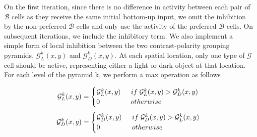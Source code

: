 \documentclass[12pt]{article}
\begin{document}
On the first iteration, since there is no difference in activity between each pair of 
$\mathcal{B}$
cells as they receive the same initial bottom-up input, we omit the inhibition by the non-preferred
$\mathcal{B}$
cells and only use the activity of the preferred
$\mathcal{B}$
cells. On subsequent iterations, we include the inhibitory term. We also implement a simple form of local inhibition between the two contrast-polarity
grouping pyramids, $\mathcal{G}^k_{L}(x,y)$ and $\mathcal{G}^k_{D}(x,y)$. At each spatial location, only one type of $\mathcal{G}$ cell should be active, representing either a light or dark object at that location. For each level of the pyramid k, we perform a max operation as follows

\begin{equation}
	\mathcal{G}^k_{L}(x,y)=
	\begin{cases}
	\mathcal{G}^k_{L}(x,y) \:\;&if\;\mathcal{G}^k_{L}(x,y) > \mathcal{G}^k_{D}(x,y)\\
	0\;&otherwise
	\end{cases}\\
\end{equation}
\begin{equation}
	\mathcal{G}^k_{D}(x,y)=
	\begin{cases}
	\mathcal{G}^k_{D}(x,y) \:\;&if\;\mathcal{G}^k_{D}(x,y) > \mathcal{G}^k_{L}(x,y)\\
	0\;&otherwise
	\end{cases}\\
\end{equation}
\end{document}
